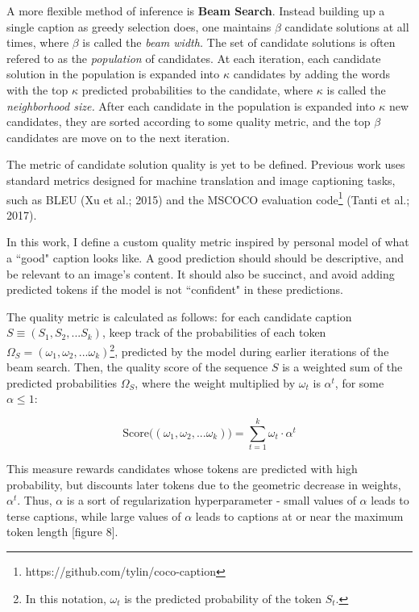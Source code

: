 \documentclass[letterpaper, 10 pt, conference]{ieeeconf}
\begin{document}
A more flexible method of inference is \textbf{Beam Search}. Instead building up a single caption as greedy selection does, one maintains $\beta$ candidate solutions at all times, where $\beta$ is called the \textit{beam width.} The set of candidate solutions is often refered to as the \textit{population} of candidates. At each iteration, each candidate solution in the population is expanded into $\kappa$ candidates by adding the words with the top $\kappa$ predicted probabilities to the candidate, where $\kappa$ is called the \textit{neighborhood size.} After each candidate in the population is expanded into $\kappa$ new candidates, they are sorted according to some quality metric, and the top $\beta$ candidates are move on to the next iteration. 

The metric of candidate solution quality is yet to be defined. Previous work uses standard metrics designed for machine translation and image captioning tasks, such as BLEU (Xu et al.; 2015) and the MSCOCO evaluation code\footnote{https://github.com/tylin/coco-caption} (Tanti et al.; 2017). 

In this work, I define a custom quality metric inspired by personal model of what a ``good" caption looks like. A good prediction should should be descriptive, and be relevant to an image's content. It should also be succinct, and avoid adding predicted tokens if the model is not ``confident" in these predictions. 

The quality metric is calculated as follows: for each candidate caption $S \equiv (S_1, S_2, ... S_k)$, keep track of the probabilities of each token $\Omega_S = (\omega_1, \omega_2, ... \omega_k)$\footnote{In this notation, $\omega_t$ is the predicted probability of the token $S_t$.}, predicted by the model during earlier iterations of the beam search. Then, the quality score of the sequence $S$ is a weighted sum of the predicted probabilities $\Omega_S$, where the weight multiplied by $\omega_t$ is $\alpha^t$, for some $\alpha \leq 1$: 

\begin{equation}
\text{Score}\big ( (\omega_1, \omega_2, ... \omega_k) \big ) = \sum_{t = 1}^k \omega_t\cdot\alpha^t
\end{equation}

This measure rewards candidates whose tokens are predicted with high probability, but discounts later tokens due to the geometric decrease in weights, $\alpha^t$. Thus, $\alpha$ is a sort of regularization hyperparameter - small values of $\alpha$ leads to terse captions, while large values of $\alpha$ leads to captions at or near the maximum token length [figure 8].  
\end{document}
